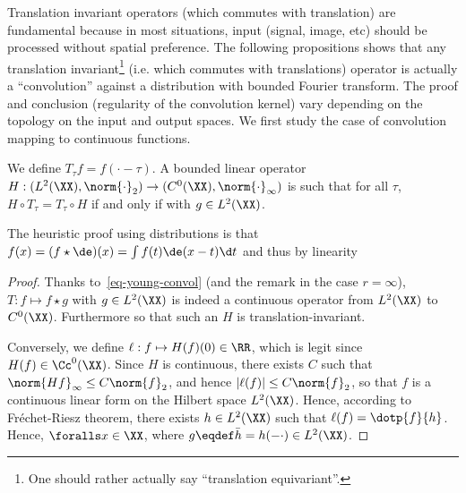 Translation invariant operators (which commutes with translation) are fundamental because in most situations, input (signal, image, etc) should be processed without spatial preference.
%
The following propositions shows that any translation invariant\footnote{One should rather actually say ``translation equivariant''.} (i.e. which commutes with translations) operator is actually a ``convolution'' against a distribution with bounded Fourier transform. 
%
The proof and conclusion (regularity of the convolution kernel) vary depending on the topology on the input and output spaces.
%
We first study the case of convolution mapping to continuous functions.

\begin{prop}
	We define $T_\tau f = f(\cdot-\tau)$.
 	A bounded linear operator $H : (L^2(\XX),\norm{\cdot}_2) \rightarrow (C^0(\XX),\norm{\cdot}_\infty)$ is such that for all $\tau$, $H \circ T_\tau = T_\tau \circ H$ if and only if 
	with $g \in L^2(\XX)$.
\end{prop}

The heuristic proof using distributions is that $f(x) = (f\star \de)(x) = \int f(t) \de(x-t) \d t$ and thus by linearity


\begin{proof}
	Thanks to~\eqref{eq-young-convol} (and the remark in the case $r=\infty$), $T : f \mapsto f \star g$ with $g \in L^2(\XX)$ is indeed a continuous operator from $L^2(\XX)$ to $C^0(\XX)$.  Furthermore
	so that such an $H$ is translation-invariant. 
	
	
	Conversely, we define $\ell : f \mapsto H(f)(0) \in \RR$, which is legit since $H(f) \in \Cc^0(\XX)$. 
	Since $H$ is continuous, there exists $C$ such that $\norm{Hf}_\infty \leq C \norm{f}_2$, and hence $|\ell(f)| \leq C \norm{f}_2$, so that $f$ is a continuous linear form on the Hilbert space $L^2(\XX)$. Hence, according to Fr\'echet-Riesz theorem, there exists $h \in L^2(\XX)$ such that $\ell(f)=\dotp{f}{h}$.
	Hence, $\foralls x \in \XX$, 
	where $g \eqdef \bar h=h(-\cdot) \in L^2(\XX)$.
\end{proof}

